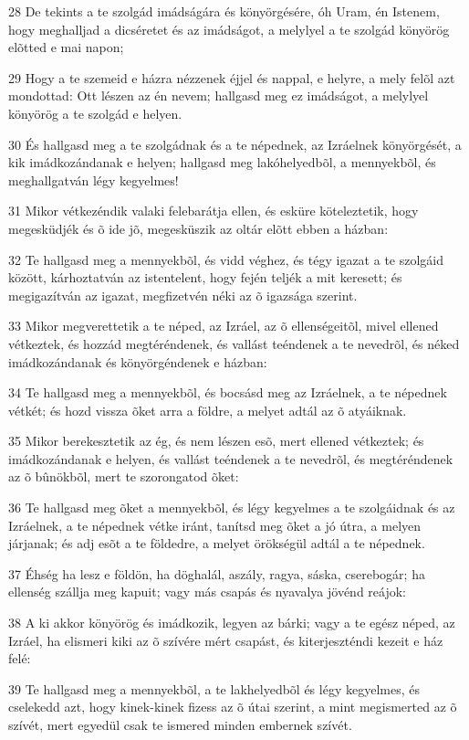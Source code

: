 \par 28 De tekints a te szolgád imádságára és könyörgésére, óh Uram, én Istenem, hogy meghalljad a dicséretet és az imádságot, a melylyel a te szolgád könyörög elõtted e mai napon;
\par 29 Hogy a te szemeid e házra nézzenek éjjel és nappal, e helyre, a mely felõl azt mondottad: Ott lészen az én nevem; hallgasd meg ez imádságot, a melylyel könyörög a te szolgád e helyen.
\par 30 És hallgasd meg a te szolgádnak és a te népednek, az Izráelnek könyörgését, a kik imádkozándanak e helyen; hallgasd meg lakóhelyedbõl, a mennyekbõl, és meghallgatván légy kegyelmes!
\par 31 Mikor vétkezéndik valaki felebarátja ellen, és esküre köteleztetik, hogy megesküdjék és õ ide jõ, megesküszik az oltár elõtt ebben a házban:
\par 32 Te hallgasd meg a mennyekbõl, és vidd véghez, és tégy igazat a te szolgáid között, kárhoztatván az istentelent, hogy fején teljék a mit keresett; és megigazítván az igazat, megfizetvén néki az õ igazsága szerint.
\par 33 Mikor megverettetik a te néped, az Izráel, az õ ellenségeitõl, mivel ellened vétkeztek, és hozzád megtéréndenek, és vallást teéndenek a te nevedrõl, és néked imádkozándanak és könyörgéndenek e házban:
\par 34 Te hallgasd meg a mennyekbõl, és bocsásd meg az Izráelnek, a te népednek vétkét; és hozd vissza õket arra a földre, a melyet adtál az õ atyáiknak.
\par 35 Mikor berekesztetik az ég, és nem lészen esõ, mert ellened vétkeztek; és imádkozándanak e helyen, és vallást teéndenek a te nevedrõl, és megtéréndenek az õ bûnökbõl, mert te szorongatod õket:
\par 36 Te hallgasd meg õket a mennyekbõl, és légy kegyelmes a te szolgáidnak és az Izráelnek, a te népednek vétke iránt, tanítsd meg õket a jó útra, a melyen járjanak; és adj esõt a te földedre, a melyet örökségül adtál a te népednek.
\par 37 Éhség ha lesz e földön, ha döghalál, aszály, ragya, sáska, cserebogár; ha ellenség szállja meg kapuit; vagy más csapás és nyavalya jövénd reájok:
\par 38 A ki akkor könyörög és imádkozik, legyen az bárki; vagy a te egész néped, az Izráel, ha elismeri kiki az õ szívére mért csapást, és kiterjeszténdi kezeit e ház felé:
\par 39 Te hallgasd meg a mennyekbõl, a te lakhelyedbõl és légy kegyelmes, és cselekedd azt, hogy kinek-kinek fizess az õ útai szerint, a mint megismerted az õ szívét, mert egyedül csak te ismered minden embernek szívét.
